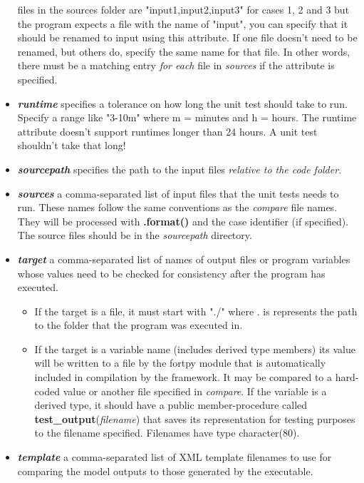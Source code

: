 \documentclass[paper=a4, fontsize=11pt]{scrartcl} %
\numberwithin{equation}{section} %
\numberwithin{figure}{section} %
\numberwithin{table}{section} %
\begin{document}
\begin{itemize}
files in the sources folder are "input1,input2,input3" for cases 1, 2 and 3 but the program expects a file
with the name of "input", you can specify that it should be renamed to input using this attribute. If one
file doesn't need to be renamed, but others do, specify the same name for that file. In other words, there
must be a matching entry \textit{for each} file in \textit{sources} if the attribute is specified.
\item \textbf{\textit{runtime}} specifies a tolerance on how long the unit test should take to run. Specify a range
like "3-10m" where m = minutes and h = hours. The runtime attribute doesn't support runtimes longer than 24
hours. A unit test shouldn't take that long!
\item \textbf{\textit{sourcepath}} specifies the path to the input files \textit{relative to the code folder}.
\item \textbf{\textit{sources}} a comma-separated list of input files that the unit tests needs to run. These names
follow the same conventions as the \textit{compare} file names. They will be processed with \textbf{.format()}
and the case identifier (if specified). The source files should be in the \textit{sourcepath} directory.
\item \textbf{\textit{target}} a comma-separated list of names of output files or program variables whose values
need to be checked for consistency after the program has executed.
  \begin{itemize}
  \item If the target is a file, it must start with "./" where . is represents the path to the folder
  that the program was executed in.
  \item If the target is a variable name (includes derived type members) its value will be written to
  a file by the fortpy module that is automatically included in compilation by the framework. It may
  be compared to a hard-coded value or another file specified in \textit{compare}. If the variable is
  a derived type, it should have a public member-procedure called \textbf{test\_output}(\textit{filename})
  that saves its representation for testing purposes to the filename specified. Filenames have type
  character(80).
  \end{itemize}
\item \textbf{\textit{template}} a comma-separated list of XML template filenames to use for comparing the model
outputs to those generated by the executable.
\end{itemize}
\end{document}
